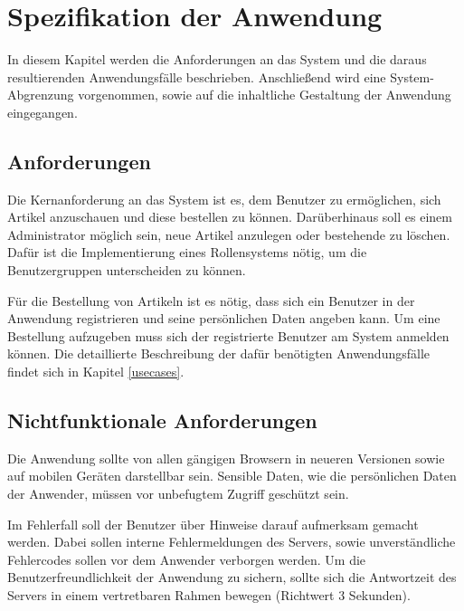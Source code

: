 \section{Spezifikation der Anwendung}
In diesem Kapitel werden die Anforderungen an das System und die daraus resultierenden Anwendungsfälle beschrieben.
Anschließend wird eine System-Abgrenzung vorgenommen, sowie auf die inhaltliche Gestaltung der Anwendung eingegangen.

\subsection{Anforderungen}
Die Kernanforderung an das System ist es, dem Benutzer zu ermöglichen, sich Artikel anzuschauen und diese bestellen zu können.
Darüberhinaus soll es einem Administrator möglich sein, neue Artikel anzulegen oder bestehende zu löschen.
Dafür ist die Implementierung eines Rollensystems nötig, um die Benutzergruppen unterscheiden zu können.

Für die Bestellung von Artikeln ist es nötig, dass sich ein Benutzer in der Anwendung registrieren und seine persönlichen Daten angeben kann.
Um eine Bestellung aufzugeben muss sich der registrierte Benutzer am System anmelden können.
Die detaillierte Beschreibung der dafür benötigten Anwendungsfälle findet sich in Kapitel \ref{usecases}.
\subsection{Nichtfunktionale Anforderungen}
Die Anwendung sollte von allen gängigen Browsern in neueren Versionen sowie auf mobilen Geräten darstellbar sein.
Sensible Daten, wie die persönlichen Daten der Anwender, müssen vor unbefugtem Zugriff geschützt sein.

Im Fehlerfall soll der Benutzer über Hinweise darauf aufmerksam gemacht werden.
Dabei sollen interne Fehlermeldungen des Servers, sowie unverständliche Fehlercodes sollen vor dem Anwender verborgen werden.
Um die Benutzerfreundlichkeit der Anwendung zu sichern, sollte sich die Antwortzeit des Servers in einem vertretbaren Rahmen bewegen (Richtwert 3 Sekunden).
